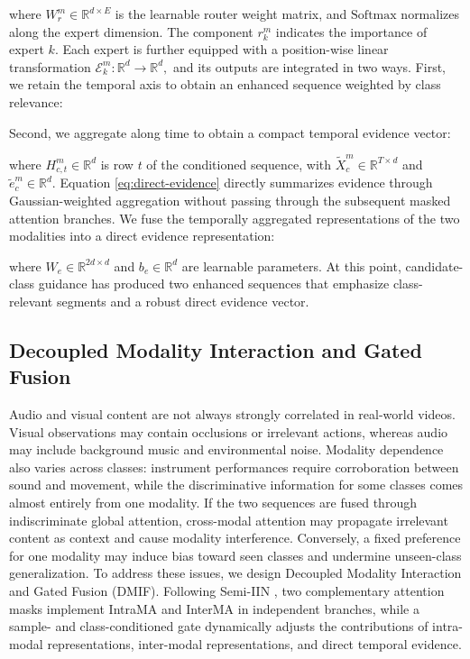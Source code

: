 
\noindent\unskip where ${W}_{r}^{m}\in {\mathbb{R}}^{d\times E}$ is the learnable router weight matrix, and $\mathrm{Softmax}$ normalizes along the expert dimension. The component ${r}_{k}^{m}$ indicates the importance of expert $k.$ Each expert is further equipped with a position-wise linear transformation ${\mathcal{E}}_{k}^{m}:{\mathbb{R}}^{d}\to {\mathbb{R}}^{d},$ and its outputs are integrated in two ways. First, we retain the temporal axis to obtain an enhanced sequence weighted by class relevance:



Second, we aggregate along time to obtain a compact temporal evidence vector:


\noindent\unskip where ${H}_{c,t}^{m}\in {\mathbb{R}}^{d}$ is row $t$ of the conditioned sequence, with ${\widetilde{X}}_{c}^{m}\in {\mathbb{R}}^{T\times d}$ and ${\widetilde{e}}_{c}^{m}\in {\mathbb{R}}^{d}.$ Equation \eqref{eq:direct-evidence} directly summarizes evidence through Gaussian-weighted aggregation without passing through the subsequent masked attention branches. We fuse the temporally aggregated representations of the two modalities into a direct evidence representation:


\noindent\unskip where ${W}_{e}\in {\mathbb{R}}^{2d\times d}$ and ${b}_{e}\in {\mathbb{R}}^{d}$ are learnable parameters. At this point, candidate-class guidance has produced two enhanced sequences that emphasize class-relevant segments and a robust direct evidence vector.

\subsection{Decoupled Modality Interaction and Gated Fusion}\label{sec:decoupled-modality-interaction-and-gated-fusion}

Audio and visual content are not always strongly correlated in real-world videos. Visual observations may contain occlusions or irrelevant actions, whereas audio may include background music and environmental noise. Modality dependence also varies across classes: instrument performances require corroboration between sound and movement, while the discriminative information for some classes comes almost entirely from one modality. If the two sequences are fused through indiscriminate global attention, cross-modal attention may propagate irrelevant content as context and cause modality interference. Conversely, a fixed preference for one modality may induce bias toward seen classes and undermine unseen-class generalization. To address these issues, we design Decoupled Modality Interaction and Gated Fusion (DMIF). Following Semi-IIN \cite{lin2025semiinn}, two complementary attention masks implement IntraMA and InterMA in independent branches, while a sample- and class-conditioned gate dynamically adjusts the contributions of intra-modal representations, inter-modal representations, and direct temporal evidence.

